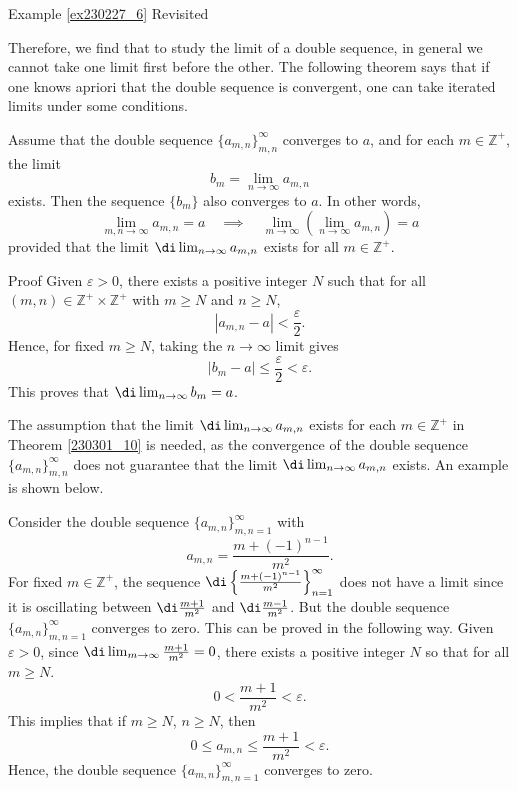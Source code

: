 \begin{example}{\linkt Example \ref{ex230227_6} Revisited}
\begin{example}[label=ex230227_13]{}
\begin{example}{}
Therefore, we find that to study the limit of a double sequence, in general we cannot take one limit first before the other. The following theorem says that  if one knows apriori that the double sequence is convergent, one can take iterated limits under some conditions.
\begin{theorem}[label=230301_10]{}
Assume that the double sequence $\{a_{m,n}\}_{m,n}^{\infty}$ converges to $a$, and for each $m\in\mathbb{Z}^+$, the limit
\[b_m=\lim_{n\to\infty}a_{m,n}\] exists. Then the sequence $\{b_m\}$ also converges to $a$. In other words,
\[\lim_{m,n\to\infty}a_{m,n}=a\quad\implies\quad \lim_{m\to\infty}\left(\lim_{n\to\infty}a_{m,n}\right)=a\] provided that the limit $\di\lim_{n\to\infty}a_{m,n}$ exists for all $m\in\mathbb{Z}^+$.
\end{theorem}
\begin{myproof}{Proof}
Given $\varepsilon>0$, there exists a positive integer $N$ such that
for all $(m,n)\in\mathbb{Z}^+\times\mathbb{Z}^+$ with $m\geq N$ and $n\geq N$, 
\[|a_{m,n}-a|<\frac{\varepsilon}{2}.\]
Hence, for fixed $m\geq N$, taking the $n\to\infty$ limit gives
\[|b_m-a|\leq\frac{\varepsilon}{2}<\varepsilon.\]
This proves that $\di\lim_{n\to\infty}b_m=a$.
\end{myproof}

The assumption that the limit $\di\lim_{n\to\infty}a_{m,n}$ exists for each $m\in\mathbb{Z}^+$ in Theorem \ref{230301_10} is needed, as the convergence of the double sequence  $\{a_{m,n}\}_{m,n}^{\infty}$ does not guarantee that the  limit $\di\lim_{n\to\infty}a_{m,n}$ exists. An example is shown below.
\begin{example}{}
Consider the double sequence $\{a_{m,n}\}_{m,n=1}^{\infty}$ with
\[a_{m,n}=\frac{m+(-1)^{n-1}}{m^2 }.\]
For fixed $m\in\mathbb{Z}^+$, the sequence $\di\left\{\frac{m+(-1)^{n-1}}{m^2 }\right\}_{n=1}^{\infty}$ does not have a limit since it is oscillating between $\di\frac{m+1}{m^2}$ and $\di\frac{m-1}{m^2}$. But the double sequence $\{a_{m,n}\}_{m,n=1}^{\infty}$ converges to zero. This can be proved in the following way. Given $\varepsilon>0$, since $\di\lim_{m\to\infty}\frac{m+1}{m^2}=0$, there exists a positive integer $N$ so that for all $m\geq N$.
\[0<\frac{m+1}{m^2}<\varepsilon.\] This implies that if $m\geq N$, $n\geq N$, then
\[0\leq a_{m,n}\leq\frac{m+1}{m^2}<\varepsilon.\]Hence, the double sequence $\{a_{m,n}\}_{m,n=1}^{\infty}$ converges to zero. 

\end{example}


\end{example}
\end{example}
\end{example}
